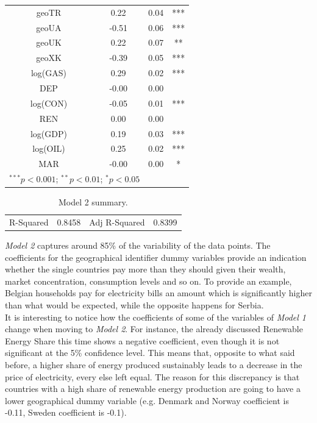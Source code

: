 \documentclass{book}
\begin{document}
\begin{table}[H]
\begin{center}
\begin{tabular}{|c|c|c|c|}
geoTR&0.22&0.04&***\\
geoUA&-0.51&0.06&***\\
geoUK&0.22&0.07&**\\
geoXK&-0.39&0.05&***\\
log(GAS)&0.29&0.02&***\\
DEP&-0.00&0.00&\\
log(CON)&-0.05&0.01&***\\
REN&0.00&0.00&\\
log(GDP)&0.19&0.03&***\\
log(OIL)&0.25&0.02&***\\
MAR&-0.00&0.00&* \\
\hline
\multicolumn{2}{l}{\scriptsize{$^{***}p<0.001$; $^{**}p<0.01$; $^{*}p<0.05$}}
\end{tabular}
\end{center}
\end{table}
\begin{table}[H]
\begin{center}
\begin{tabular}{|c|c|c|c|}
\hline
\rowcolor{maroon} \multicolumn{4}{|c|}{Global Performance}\\
\hline
R-Squared&0.8458&Adj R-Squared&0.8399\\
\hline
\end{tabular}
\caption{Model 2 summary.}
\end{center}
\end{table}
\bigskip

\textit{Model 2} captures around 85\% of the variability of the data points. The coefficients for the geographical identifier dummy variables provide an indication whether the single countries pay more than they should given their wealth, market concentration, consumption levels and so on. To provide an example, Belgian households pay for electricity bills an amount which is significantly higher than what would be expected, while the opposite happens for Serbia.\\

It is interesting to notice how the coefficients of some of the variables of \textit{Model 1} change when moving to \textit{Model 2}. For instance, the already discussed Renewable Energy Share this time shows a negative coefficient, even though it is not significant at the 5\% confidence level. This means that, opposite to what said before, a higher share of energy produced sustainably leads to a decrease in the price of electricity, every else left equal. The reason for this discrepancy is that countries with a high share of renewable energy production are going to have a lower geographical dummy variable (e.g. Denmark and Norway coefficient is -0.11, Sweden coefficient is -0.1).\\
\end{document}
